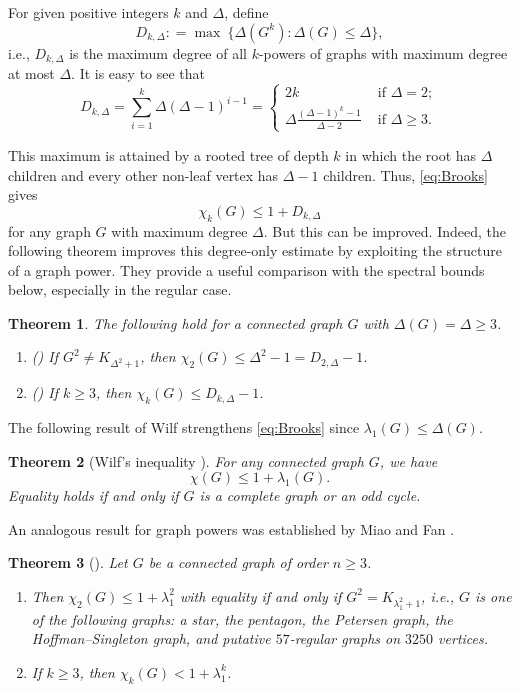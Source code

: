 \documentclass[11pt]{article}
\theoremstyle{plain}
\newtheorem{theorem}{Theorem}[section]
\numberwithin{equation}{section}
\begin{document}
For given positive integers $k$ and $\Delta$, define 
\[ D_{k, \Delta}: = \max\ \{\Delta(G^k): \Delta(G)\le \Delta\},\]
i.e., $D_{k, \Delta}$ is the maximum degree of all $k$-powers of graphs with maximum degree at most $\Delta$. It is easy to see that 
\[ D_{k, \Delta} = \sum_{i=1}^k \Delta(\Delta - 1)^{i-1} =
\begin{cases}
  2k & \text{ if }\Delta =2;\\
  \Delta \frac{(\Delta-1)^k - 1}{\Delta - 2} & \text{ if }\Delta \ge 3.
\end{cases} \]

This maximum is attained by a rooted tree of depth $k$ in which the root has $\Delta$ children and every other non-leaf vertex has $\Delta-1$ children. Thus, \eqref{eq:Brooks} gives
\[\chi_k(G)\le 1 + D_{k, \Delta}\]
for any graph $G$ with maximum degree $\Delta$. But this can be improved. Indeed, the following theorem improves this degree-only estimate by exploiting the structure of a graph power. They provide a useful comparison with the spectral bounds below, especially in the regular case.

\begin{theorem} The following hold for a connected graph $G$ with $\Delta(G) = \Delta \ge 3$.  
\begin{enumerate}[$(i)$]
    \item (\cite{Cranston_Rabern_2016}) If $G^2 \neq K_{\Delta^2 +1}$, then $\chi_2(G)\le \Delta^2 -1 = D_{2, \Delta}-1$.
    \item (\cite{Bonamy_Bousquet_2014}) If $k\ge 3$, then $\chi_k(G)\le D_{k, \Delta} - 1$.
\end{enumerate}
\end{theorem}

The following result of Wilf \cite{Wilf_1967} strengthens \eqref{eq:Brooks} since $\lambda_1(G)\le \Delta(G)$.
 
\begin{theorem}[Wilf's inequality \cite{Wilf_1967}]\label{thm:Wilf}
For any connected graph $G$, we have 
    \[ \chi(G) \le 1 + \lambda_1(G).\]
Equality holds if and only if $G$ is a complete graph or an odd cycle.  
\end{theorem}

An analogous result for graph powers was established by Miao and Fan \cite{Miao_Fan_2014}.

\begin{theorem}[\cite{Miao_Fan_2014}]\label{thm:wilf_type_bound_graph_powers}
        Let $G$ be a connected graph of order $n\ge 3$. 
    \begin{enumerate}[$(i)$]
        \item Then $\chi_2(G)\le 1 + \lambda_1^2$ with equality if and only if $G^2 = K_{\lambda_1^2 + 1}$, i.e., $G$ is one of the following graphs: a star, the pentagon, the Petersen graph, the Hoffman--Singleton graph, and putative $57$-regular graphs on $3250$ vertices. 
        \item If $k\ge 3$, then $\chi_k(G) < 1 + \lambda_1^k$. 
    \end{enumerate}
\end{theorem}
\end{document}
